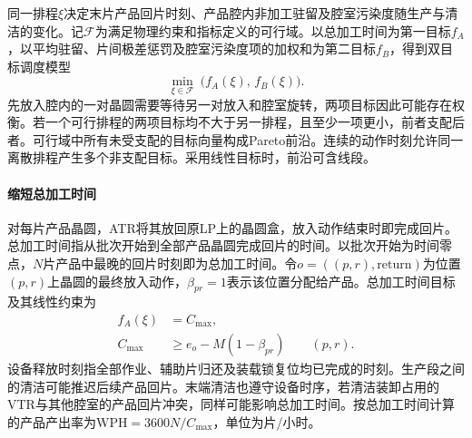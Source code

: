 \documentclass[preprint,12pt,nonatbib]{elsarticle}
\begin{document}
同一排程$\xi$决定末片产品回片时刻、产品腔内非加工驻留及腔室污染度随生产与清洁的变化。记$\mathcal F$为满足物理约束和指标定义的可行域。以总加工时间为第一目标$f_A$，以平均驻留、片间极差惩罚及腔室污染度项的加权和为第二目标$f_B$，得到双目标调度模型
\begin{equation}
\min_{\xi\in\mathcal F}\ \bigl(f_A(\xi),\,f_B(\xi)\bigr).
\label{eq:biobjective-cn}
\end{equation}
先放入腔内的一对晶圆需要等待另一对放入和腔室旋转，两项目标因此可能存在权衡。若一个可行排程的两项目标均不大于另一排程，且至少一项更小，前者支配后者。可行域中所有未受支配的目标向量构成Pareto前沿。连续的动作时刻允许同一离散排程产生多个非支配目标。采用线性目标时，前沿可含线段\citep{soylu2016biobjective}。

\paragraph{缩短总加工时间}
对每片产品晶圆，ATR将其放回原LP上的晶圆盒，放入动作结束时即完成回片。总加工时间指从批次开始到全部产品晶圆完成回片的时间。以批次开始为时间零点，$N$片产品中最晚的回片时刻即为总加工时间。令$o=((p,r),\mathrm{return})$为位置$(p,r)$上晶圆的最终放入动作，$\beta_{pr}=1$表示该位置分配给产品。总加工时间目标及其线性约束为
\begin{equation}
\begin{aligned}
f_A(\xi)&=C_{\max},\\
C_{\max}&\ge e_o-M(1-\beta_{pr})\qquad (p,r).
\end{aligned}
\label{eq:primary-objective-cn}
\end{equation}
设备释放时刻指全部作业、辅助片归还及装载锁复位均已完成的时刻。生产段之间的清洁可能推迟后续产品回片。末端清洁也遵守设备时序，若清洁装卸占用的VTR与其他腔室的产品回片冲突，同样可能影响总加工时间。按总加工时间计算的产品产出率为$\mathrm{WPH}=3600N/C_{\max}$，单位为片/小时。
\end{document}
